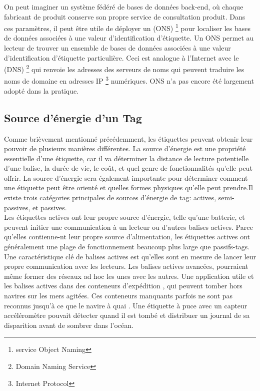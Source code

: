 \documentclass[11pt, a4paper, twoside]{book}
\begin{document}
On peut imaginer un système fédéré de bases de données back-end, où chaque fabricant de produit conserve son propre service de consultation produit. Dans ces paramètres, il peut être utile de déployer un (ONS) \footnote{service Object Naming} pour localiser les bases de données associées à une valeur d'identification d'étiquette. Un ONS permet au lecteur de trouver un ensemble de bases de données associées à une valeur d'identification d'étiquette particulière. Ceci est analogue à l'Internet avec le (DNS) \footnote{Domain Naming Service} qui renvoie les adresses des serveurs de noms qui peuvent traduire les noms de domaine en adresses IP \footnote{Internet Protocol} numériques. ONS n'a pas encore été largement adopté dans la pratique.
\subsection{Source d'énergie d'un Tag}
Comme brièvement mentionné précédemment, les étiquettes peuvent obtenir leur pouvoir de plusieurs manières différentes. La source d'énergie est une propriété essentielle d'une étiquette, car il va déterminer la distance de lecture potentielle d'une balise, la durée de vie, le coût, et quel genre de fonctionnalités qu'elle peut offrir. La source d'énergie sera également importante pour déterminer comment une étiquette peut être orienté et quelles formes physiques qu'elle peut prendre.Il existe trois catégories principales de sources d'énergie de tag: actives, semi-passives, et passives.\\

 Les étiquettes actives ont leur propre source d'énergie, telle qu'une batterie, et peuvent initier une communication à un lecteur ou d'autres balises actives. Parce qu'elles contienne-nt leur propre source d'alimentation, les étiquettes actives ont généralement une plage de fonctionnement beaucoup plus large que passifs-tags. Une caractéristique clé de balises actives est qu'elles sont en mesure de lancer leur propre communication avec les lecteurs. Les balises actives avancées, pourraient même former des réseaux ad hoc les unes avec les autres. Une application utile et les balises actives dans des conteneurs d'expédition , qui peuvent tomber hors navires sur les mers agitées. Ces conteneurs manquants parfois ne sont pas reconnus jusqu'à ce que le navire à quai . Une étiquette à puce avec un capteur accéléromètre pouvait détecter quand il est tombé et distribuer un journal de sa disparition avant de sombrer dans l'océan.\\
\end{document}
